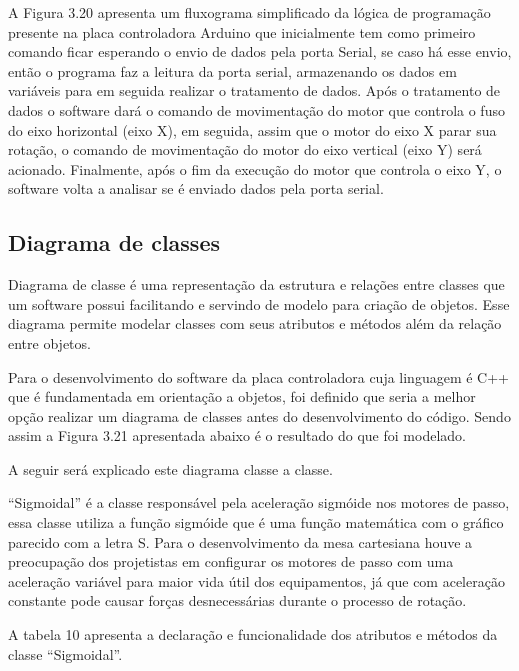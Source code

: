 A Figura 3.20 apresenta um fluxograma simplificado da lógica de programação presente na placa controladora 
Arduino que inicialmente tem como primeiro comando ficar esperando o envio de dados pela porta Serial, 
se caso há esse envio, então o programa faz a leitura da porta serial, armazenando os dados em variáveis 
para em seguida realizar o tratamento de dados. Após o tratamento de dados o software dará o comando de 
movimentação do motor que controla o fuso do eixo horizontal (eixo X), em seguida, assim que o motor do 
eixo X parar sua rotação, o comando de movimentação do motor do eixo vertical (eixo Y) será acionado. 
Finalmente, após o fim da execução do motor que controla o eixo Y, o software volta a analisar se é enviado 
dados pela porta serial.


\subsection{Diagrama de classes}

Diagrama de classe é uma representação da estrutura e relações entre classes que um software possui facilitando 
e servindo de modelo para criação de objetos. Esse diagrama permite modelar classes com seus atributos e métodos 
além da relação entre objetos.

Para o desenvolvimento do software da placa controladora cuja linguagem é C++ que é fundamentada em orientação 
a objetos, foi definido que seria a melhor opção realizar um diagrama de classes antes do desenvolvimento do código. 
Sendo assim a Figura 3.21 apresentada abaixo é o resultado do que foi modelado.


A seguir será explicado este diagrama classe a classe.

“Sigmoidal” é a classe responsável pela aceleração sigmóide nos motores de passo, essa classe utiliza 
a função sigmóide que é uma função matemática com o gráfico parecido com a letra S. Para o desenvolvimento 
da mesa cartesiana houve a preocupação dos projetistas em configurar os motores de passo com uma aceleração 
variável para maior vida útil dos equipamentos, já que com aceleração constante pode causar forças desnecessárias 
durante o processo de rotação.

A tabela 10 apresenta a declaração e funcionalidade dos atributos e métodos da classe “Sigmoidal”.


